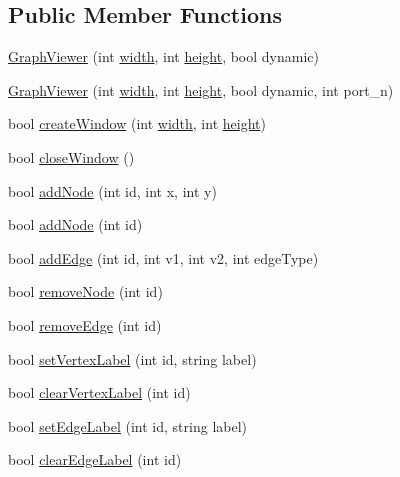 \subsection*{Public Member Functions}
\begin{DoxyCompactItemize}
\item 
\hyperlink{classGraphViewer_a8adc614f4fc290a3efcec7d7ceb1c58a}{Graph\+Viewer} (int \hyperlink{classGraphViewer_a5de27a1d20968b8494cd4bf5a4eb27e1}{width}, int \hyperlink{classGraphViewer_a9a1000e492a66ac4301c7135275690da}{height}, bool dynamic)
\item 
\hyperlink{classGraphViewer_ad9d7b1d8b4ba8ef18517eae0e68568a2}{Graph\+Viewer} (int \hyperlink{classGraphViewer_a5de27a1d20968b8494cd4bf5a4eb27e1}{width}, int \hyperlink{classGraphViewer_a9a1000e492a66ac4301c7135275690da}{height}, bool dynamic, int port\+\_\+n)
\item 
bool \hyperlink{classGraphViewer_ae5247dc66449dcd21fc5d531bbbaddfa}{create\+Window} (int \hyperlink{classGraphViewer_a5de27a1d20968b8494cd4bf5a4eb27e1}{width}, int \hyperlink{classGraphViewer_a9a1000e492a66ac4301c7135275690da}{height})
\item 
bool \hyperlink{classGraphViewer_a85990c1eaac7feed3950960d4bd2fd4c}{close\+Window} ()
\item 
bool \hyperlink{classGraphViewer_a5421e86ac76433876309236ba96e70a2}{add\+Node} (int id, int x, int y)
\item 
bool \hyperlink{classGraphViewer_ab9be856eb5f45284719a3bb119ec01ea}{add\+Node} (int id)
\item 
bool \hyperlink{classGraphViewer_aad0c1448c37f744209ffb671f1bd0015}{add\+Edge} (int id, int v1, int v2, int edge\+Type)
\item 
bool \hyperlink{classGraphViewer_a0c418639bb911eb827cabf895915f775}{remove\+Node} (int id)
\item 
bool \hyperlink{classGraphViewer_a9a8ee68c7c12b373affbe4069dd95d72}{remove\+Edge} (int id)
\item 
bool \hyperlink{classGraphViewer_ac25d7d007022fda16799808ba136e909}{set\+Vertex\+Label} (int id, string label)
\item 
bool \hyperlink{classGraphViewer_a007bd78a6959ac37119eb18a8e8bca4c}{clear\+Vertex\+Label} (int id)
\item 
bool \hyperlink{classGraphViewer_a447cca0064e785654c2105602c2961ca}{set\+Edge\+Label} (int id, string label)
\item 
bool \hyperlink{classGraphViewer_a8b90527371bd990806eb32620be765be}{clear\+Edge\+Label} (int id)

\end{DoxyCompactItemize}
